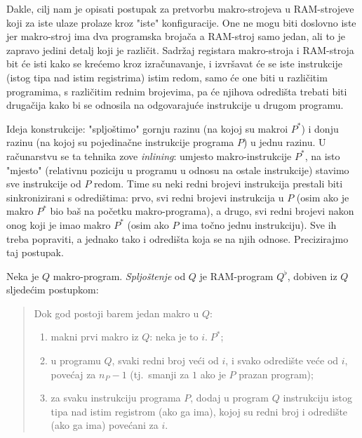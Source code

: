 Dakle, cilj nam je opisati postupak za pretvorbu makro-strojeva u RAM-strojeve koji za iste ulaze prolaze kroz "iste" konfiguracije. One ne mogu biti doslovno iste jer makro-stroj ima dva programska brojača a RAM-stroj samo jedan, ali to je zapravo jedini detalj koji je različit. Sadržaj registara makro-stroja i RAM-stroja bit će isti kako se krećemo kroz izračunavanje, i izvršavat će se iste instrukcije (istog tipa nad istim registrima) istim redom, samo će one biti u različitim programima, s različitim rednim brojevima, pa će njihova odredišta trebati biti drugačija kako bi se odnosila na odgovarajuće instrukcije u drugom programu.

Ideja konstrukcije: "spljoštimo" gornju razinu (na kojoj su makroi $P^*$) i donju razinu (na kojoj su pojedinačne instrukcije programa $P$) u jednu razinu. U računarstvu se ta tehnika zove \emph{inlining}: umjesto makro-instrukcije $P^*$\!, na isto "mjesto" (relativnu poziciju u programu u odnosu na ostale instrukcije) stavimo sve instrukcije od $P$ redom. Time su neki redni brojevi instrukcija prestali biti sinkronizirani s odredištima: prvo, svi redni brojevi instrukcija u $P$ (osim ako je makro $P^*$ bio baš na početku makro-programa), a drugo, svi redni brojevi nakon onog koji je imao makro $P^*$ (osim ako $P$ ima točno jednu instrukciju). Sve ih treba popraviti, a jednako tako i odredišta koja se na njih odnose. Precizirajmo taj postupak.

\begin{definicija}[{name=[spljoštenje]}]\label{def:flat}
Neka je $Q$ makro-program. \emph{Spljoštenje} od $Q$ je RAM-program $Q^\flat$, dobiven iz $Q$ sljedećim postupkom:
\begin{quotation}
Dok god postoji barem jedan makro u $Q$:
\begin{enumerate}
    \item\label{korak:makni} makni prvi makro iz $Q$: neka je to $i.\;P^*$;
    \item\label{korak:renumeriraj} u programu $Q$, svaki redni broj veći od $i$, i svako odredište veće od $i$, povećaj za $n_P-1$ (tj.\ smanji za $1$ ako je $P$ prazan program);
    \item\label{korak:dodaj} za svaku instrukciju programa $P$, dodaj u program $Q$ instrukciju istog tipa nad istim registrom (ako ga ima), kojoj su redni broj i odredište (ako ga ima) povećani za $i$.\qedhere
\end{enumerate}
\end{quotation}
\end{definicija}

